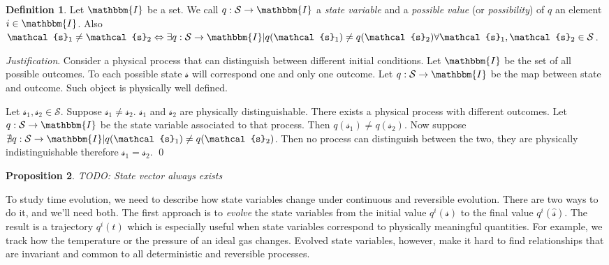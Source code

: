 \documentclass[aps,pra,10pt,twocolumn,floatfix,nofootinbib]{revtex4-1}
\newtheorem{prop}{Proposition}[section]
\theoremstyle{definition}
\newtheorem{defn}[prop]{Definition}
\newenvironment{justification}{\emph{Justification}.}{\qed}
\begin{document}
\begin{defn}\label{state_variable}
Let $\mathbbm{I}$ be a set. We call $q : \mathcal{S} \rightarrow \mathbbm{I}$ a \emph{state variable} and a \emph{possible value} (or \emph{possibility}) of $q$ an element $i \in \mathbbm{I}$. Also $\mathcal{s}_1 \neq \mathcal{s}_2 \Leftrightarrow \exists q : \mathcal{S} \rightarrow \mathbbm{I} | q(\mathcal{s}_1)\neq q(\mathcal{s}_2) \forall \mathcal{s}_1, \mathcal{s}_2 \in \mathcal{S}$.
\end{defn}

\begin{justification}
Consider a physical process that can distinguish between different initial conditions. Let $\mathbbm{I}$ be the set of all possible outcomes. To each possible state $\mathcal{s}$ will correspond one and only one outcome. Let $q : \mathcal{S} \rightarrow \mathbbm{I}$ be the map between state and outcome. Such object is physically well defined.

Let $\mathcal{s}_1, \mathcal{s}_2 \in \mathcal{S}$. Suppose $\mathcal{s}_1 \neq \mathcal{s}_2$. $\mathcal{s}_1$ and $\mathcal{s}_2$ are physically distinguishable. There exists a physical process with different outcomes. Let $q : \mathcal{S} \rightarrow \mathbbm{I}$ be the state variable associated to that process. Then $q(\mathcal{s}_1)\neq q(\mathcal{s}_2)$. Now suppose $\nexists q : \mathcal{S} \rightarrow \mathbbm{I} | q(\mathcal{s}_1) \neq q(\mathcal{s}_2)$. Then no process can distinguish between the two, they are physically indistinguishable therefore $\mathcal{s}_1 = \mathcal{s}_2$.
\end{justification}

\begin{prop}\label{state_vector}
TODO: State vector always exists
\end{prop}

To study time evolution, we need to describe how state variables change under continuous and reversible evolution. There are two ways to do it, and we'll need both. The first approach is to \emph{evolve} the state variables from the initial value $q^i(\mathcal{s})$ to the final value $q^i(\hat{\mathcal{s}})$. The result is a trajectory $q^i(t)$ which is especially useful when state variables correspond to physically meaningful quantities. For example, we track how the temperature or the pressure of an ideal gas changes. Evolved state variables, however, make it hard to find relationships that are invariant and common to all deterministic and reversible processes.
\end{document}
